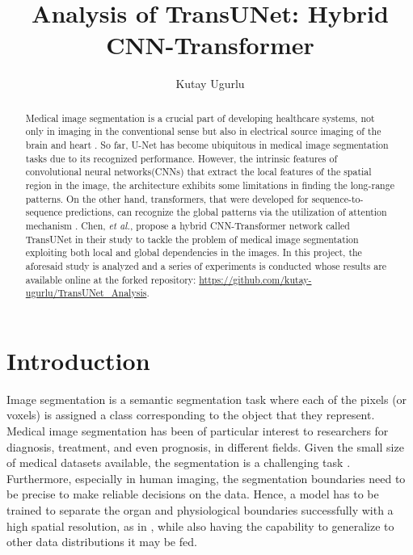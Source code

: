 \documentclass{IEEEtran}
\date{}
\title{Analysis of TransUNet: Hybrid CNN-Transformer}
\author{Kutay Ugurlu}
\begin{document}
\maketitle
\nopagebreak
\onecolumn{
\tableofcontents
\listoffigures
\listoftables
}
\twocolumn
\maketitle
\begin{abstract}
    Medical image segmentation is a crucial part of developing healthcare systems, not only in imaging in the conventional sense but also in electrical source imaging of the brain and heart \cite{gonzalez2020ecgi}. So far, U-Net\cite[text]{ronneberger2015u} has become ubiquitous in medical image segmentation tasks due to its recognized performance. However, the intrinsic features of convolutional neural networks(CNNs) that extract the local features of the spatial region in the image, the architecture exhibits some limitations in finding the long-range patterns. On the other hand, transformers, that were developed for sequence-to-sequence predictions, can recognize the global patterns via the utilization of attention mechanism \cite{vaswani2017attention}. Chen, \textit{et al.}, propose a hybrid CNN-Transformer network called TransUNet in their study  \cite{chen2021transunet} to tackle the problem of medical image segmentation exploiting both local and global dependencies in the images.
    In this project, the aforesaid study is analyzed and a series of experiments is conducted whose results are available online at the forked repository: \href{https://github.com/kutay-ugurlu/TransUNet_Analysis}{https://github.com/kutay-ugurlu/TransUNet\_Analysis}. 
\end{abstract}
\section{Introduction}

Image segmentation is a semantic segmentation task where each of the pixels (or voxels) is assigned a class corresponding to the object that they represent. Medical image segmentation has been of particular interest to researchers for diagnosis, treatment, and even prognosis, in different fields. Given the small size of medical datasets available, the segmentation is a challenging task \cite{ren2019brain}. Furthermore, especially in human imaging, the segmentation boundaries need to be precise to make reliable decisions on the data. Hence, a model has to be trained to separate the organ and physiological boundaries successfully with a high spatial resolution, as in , while also having the capability to generalize to other data distributions it may be fed. 
\end{document}
